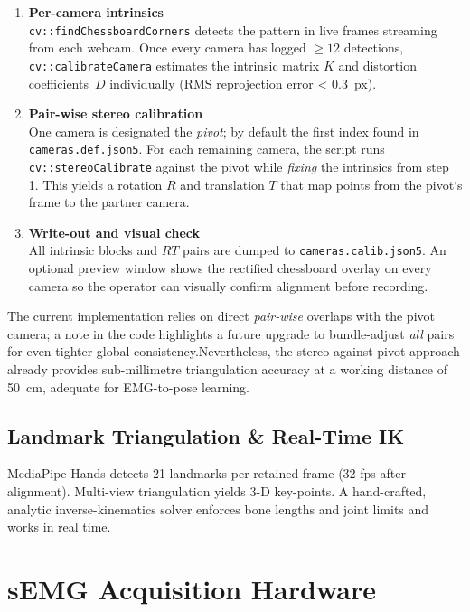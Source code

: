 \begin{enumerate}[label=\arabic*.]
  \item \textbf{Per-camera intrinsics}\\
        \verb|cv::findChessboardCorners| detects the pattern in live frames
        streaming from each webcam. Once every camera has logged
        $\ge12$ detections, \verb|cv::calibrateCamera| estimates the intrinsic
        matrix $K$ and distortion coefficients~$D$ individually
        (RMS reprojection error < \SI{0.3}{px}).

  \item \textbf{Pair-wise stereo calibration}\\
        One camera is designated the \emph{pivot}; by default the first index
        found in \texttt{cameras.def.json5}. For each remaining camera, the
        script runs \verb|cv::stereoCalibrate| against the pivot while
        \emph{fixing} the intrinsics from step 1.
        This yields a rotation $R$ and translation $T$ that map points from the
        pivot`s frame to the partner camera.

  \item \textbf{Write-out and visual check}\\
        All intrinsic blocks and $R\!T$ pairs are dumped to
        \texttt{cameras.calib.json5}. An optional preview window shows the
        rectified chessboard overlay on every camera so the operator can
        visually confirm alignment before recording.
\end{enumerate}

\noindent
The current implementation relies on direct \emph{pair-wise} overlaps with the
pivot camera; a note in the code highlights a future upgrade to bundle-adjust
\emph{all} pairs for even tighter global consistency.Nevertheless, the
stereo-against-pivot approach already provides sub-millimetre triangulation
accuracy at a working distance of \SI{50}{\centi\metre}, adequate for EMG-to-pose
learning.

\subsection{Landmark Triangulation \& Real-Time IK}
MediaPipe Hands detects 21 landmarks per retained frame (32 fps after
alignment). Multi-view triangulation yields 3-D key-points. A hand-crafted,
analytic inverse-kinematics solver enforces bone lengths and joint limits and works in real time.

\section{sEMG Acquisition Hardware}

